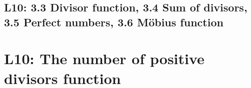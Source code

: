 \documentclass[10pt]{article}
\theoremstyle{definition}
\theoremstyle{plain}
\numberwithin{equation}{section}
\begin{document}























\newpage
\subsection{L10: 3.3 Divisor function, 3.4 Sum of divisors, 3.5 Perfect numbers, 3.6 Möbius function}

\section*{L10: The number of positive divisors function}
\end{document}
